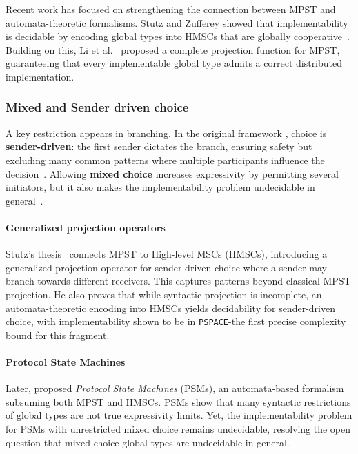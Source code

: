 Recent work has focused on strengthening the connection between MPST 
and automata-theoretic formalisms. Stutz and Zufferey 
showed that implementability is decidable by encoding global types 
into HMSCs that are globally cooperative~\cite{stutz2022comparing,stutz2023asynchronous}. 
Building on this, Li et al.~\cite{li2023complete} proposed a complete 
projection function for MPST, guaranteeing that every implementable 
global type admits a correct distributed implementation.

\subsubsection{Mixed and Sender driven choice}
A key restriction appears in branching. In the original framework \cite{honda2008multiparty,carbone2012structured}, 
choice is \textbf{sender-driven}: the first sender dictates the branch, 
ensuring safety but excluding many common patterns where multiple 
participants influence the decision~\cite{carbone2012structured}.  
Allowing \textbf{mixed choice} increases expressivity by permitting 
several initiators, but it also makes the implementability problem 
undecidable in general~\cite{barbanera2020choreography}.  

\paragraph{Generalized projection operators}
Stutz’s thesis~\cite{stutz2024implementability} connects MPST to 
High-level MSCs (HMSCs), introducing a generalized projection operator 
for sender-driven choice where a sender may branch towards different 
receivers. This captures patterns beyond classical MPST projection.  
He also proves that while syntactic projection is incomplete, 
an automata-theoretic encoding into HMSCs yields decidability for 
sender-driven choice, with implementability shown to be in 
\verb|PSPACE|-the first precise complexity bound for this fragment.

\paragraph{Protocol State Machines}
Later, \cite{stutz2025automata} proposed \emph{Protocol State Machines} 
(PSMs), an automata-based formalism subsuming both MPST and HMSCs. 
PSMs show that many syntactic restrictions of global types are not 
true expressivity limits. Yet, the implementability problem for PSMs 
with unrestricted mixed choice remains undecidable, resolving the 
open question that mixed-choice global types are undecidable in general.  

